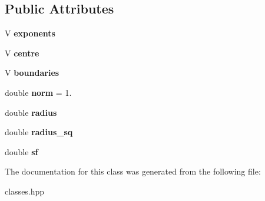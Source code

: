\subsection*{Public Attributes}
\begin{DoxyCompactItemize}
\item 
\mbox{\label{classUSphere_a923a6bc6238a4384bf604bc9476becd9}} 
V {\bfseries exponents}
\item 
\mbox{\label{classUSphere_a9e05e0e4957cf7508bee64d6918e4c30}} 
V {\bfseries centre}
\item 
\mbox{\label{classUSphere_ae0b4eb288670c23826958eba22f32bec}} 
V {\bfseries boundaries}
\item 
\mbox{\label{classUSphere_a70a86b7500539299f8ec719674af4b56}} 
double {\bfseries norm} = 1.
\item 
\mbox{\label{classUSphere_a406c953a968843a87031816d9e4bb95c}} 
double {\bfseries radius}
\item 
\mbox{\label{classUSphere_a2cedc47dac2ac01d7d9d1844781a15c3}} 
double {\bfseries radius\+\_\+sq}
\item 
\mbox{\label{classUSphere_a8dd5afd17539806a3dbb369008dfb487}} 
double {\bfseries sf}
\end{DoxyCompactItemize}


The documentation for this class was generated from the following file\+:\begin{DoxyCompactItemize}
\item 
classes.\+hpp\end{DoxyCompactItemize}
